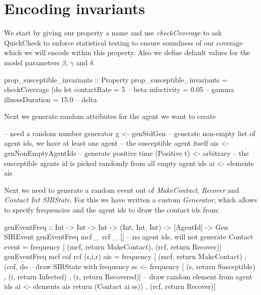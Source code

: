 \section{Encoding invariants}
We start by giving our property a name and use \textit{checkCoverage} to ask QuickCheck to enforce statistical testing to ensure soundness of our coverage which we will encode within this property. Also we define default values for the model parameters $\beta$, $\gamma$ and $\delta$.

\begin{HaskellCode}
prop_susceptible_invariants :: Property
prop_susceptible_invariants = checkCoverage (do
  let contactRate     = 5     -- beta
      infectivity     = 0.05  -- gamma
      illnessDuration = 15.0  -- delta
\end{HaskellCode}

Next we generate random attributes for the agent we want to create

\begin{HaskellCode}
-- need a random number generator
g <- genStdGen
-- generate non-empty list of agent ids, we have at least one agent
-- the susceptible agent itself
ais <- genNonEmptyAgentIds
-- generate positive time
(Positive t) <- arbitrary
-- the susceptible agents id is picked randomly from all empty agent ids
ai <- elements ais 
\end{HaskellCode}

Next we need to generate a random event out of \textit{MakeContact}, \textit{Recover} and \textit{Contact Int SIRState}. For this we have written a custom \textit{Generator}, which allows to specify frequencies and the agent ids to draw the contact ids from:

\begin{HaskellCode}
genEventFreq :: Int -> Int -> Int -> (Int, Int, Int) -> [AgentId] -> Gen SIREvent
genEventFreq mcf _ rcf _ []  
  -- no agent ids, will not generate Contact event
  = frequency [ (mcf, return MakeContact), (rcf, return Recover)]
genEventFreq mcf cof rcf (s,i,r) ais
  = frequency [ (mcf, return MakeContact)
              , (cof, do
                  -- draw SIRState with frequency 
                  ss <- frequency [ (s, return Susceptible)
                                  , (i, return Infected)
                                  , (r, return Recovered)]
                  -- draw random element from agent ids
                  ai <- elements ais
                  return (Contact ai ss))
              , (rcf, return Recover)]
\end{HaskellCode}

